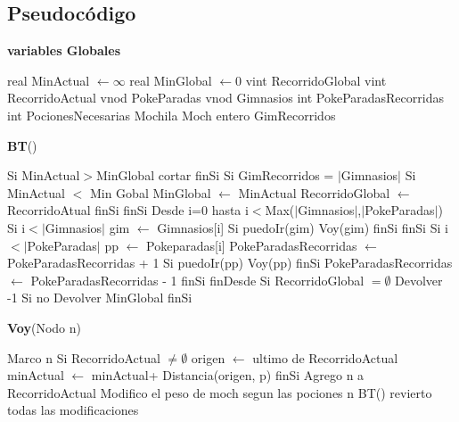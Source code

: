 \documentclass[spanish,12pt]{article}
\begin{document}

\subsection{Pseudocódigo}

\begin{algorithm}[H]{\textbf{variables Globales}}
	\begin{algorithmic}[1]
		\State real MinActual $\gets \infty$
		\State real MinGlobal $\gets 0$
		\State vint RecorridoGlobal
		\State vint RecorridoActual
		\State vnod PokeParadas
		\State vnod Gimnasios
		\State int PokeParadasRecorridas
		\State int PocionesNecesarias		
		\State Mochila Moch	
		\State entero GimRecorridos	
	
	\end{algorithmic}
\end{algorithm}

\begin{algorithm}[H]{\textbf{BT}()}
	\begin{algorithmic}[1]
		\State Si  MinActual$>$MinGlobal  
			 \State \quad cortar
		\State finSi
		\State Si GimRecorridos = $|$Gimnasios$|$ 
			\State \quad Si MinActual $<$ Min Gobal
				\State \qquad MinGlobal $\gets$ MinActual
				\State \qquad RecorridoGlobal $\gets$ RecorridoAtual
			\State \quad finSi
		\State finSi
		\State Desde i=0 hasta i$<$Max($|$Gimnasios$|$,$|$PokeParadas$|$)
			\State \quad Si i$< |$Gimnasios$|$
				\State \quad \quad gim $\gets$ Gimnasios[i]
				\State \quad \quad Si puedoIr(gim)
					\State \quad \quad \quad Voy(gim)
		 		\State \quad \quad finSi	
			\State \quad finSi
			\State \quad Si i $< |$PokeParadas$|$
				\State \qquad pp $\gets$ Pokeparadas[i]
				\State \qquad PokeParadasRecorridas $\gets$ PokeParadasRecorridas + 1 
				\State \qquad Si puedoIr(pp)
					\State \qquad \quad Voy(pp) 	
				\State \qquad finSi
				\State \qquad PokeParadasRecorridas $\gets$ PokeParadasRecorridas - 1 
			\State \quad finSi 
		\State finDesde
		\State Si RecorridoGlobal $= \emptyset$
			\State \quad Devolver -1
		\State Si no
			\State \quad Devolver MinGlobal
		\State finSi
 
	\end{algorithmic}
\end{algorithm}

\begin{algorithm}[H]{\textbf{Voy}(Nodo n)}
	\begin{algorithmic}[1]
		\State Marco n
		\State Si RecorridoActual $ \not= \emptyset$
		\State \quad origen $\gets$ ultimo de RecorridoActual
		\State \quad minActual $\gets$ minActual+ Distancia(origen, p)
		\State finSi
		\State Agrego n a RecorridoActual
		\State Modifico el peso de moch segun las pociones n
		\State BT()
		\State revierto todas las modificaciones
	\end{algorithmic}
\end{algorithm}
\end{document}
